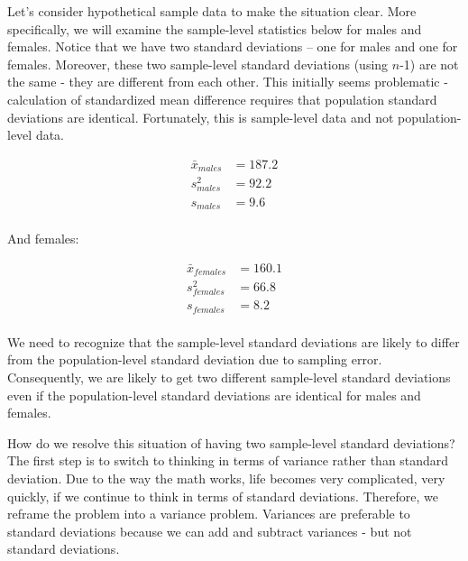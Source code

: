\documentclass[
]{krantz}
\begin{document}
Let's consider hypothetical sample data to make the situation clear. More specifically, we will examine the sample-level statistics below for males and females. Notice that we have two standard deviations -- one for males and one for females. Moreover, these two sample-level standard deviations (using \(n\)-1) are not the same - they are different from each other. This initially seems problematic - calculation of standardized mean difference requires that population standard deviations are identical. Fortunately, this is sample-level data and not population-level data.

\[
\begin{aligned} 
\bar{x}_{males} &= 187.2 \\
s_{males}^2 &= 92.2 \\
s_{males} &= 9.6 \\
\end{aligned} 
\]

And females:

\[
\begin{aligned} 
\bar{x}_{females} &= 160.1 \\
s_{females}^2 &= 66.8 \\
s_{females} &= 8.2 \\
\end{aligned} 
\]

We need to recognize that the sample-level standard deviations are likely to differ from the population-level standard deviation due to sampling error. Consequently, we are likely to get two different sample-level standard deviations even if the population-level standard deviations are identical for males and females.

How do we resolve this situation of having two sample-level standard deviations? The first step is to switch to thinking in terms of variance rather than standard deviation. Due to the way the math works, life becomes very complicated, very quickly, if we continue to think in terms of standard deviations. Therefore, we reframe the problem into a variance problem. Variances are preferable to standard deviations because we can add and subtract variances - but not standard deviations.
\end{document}
